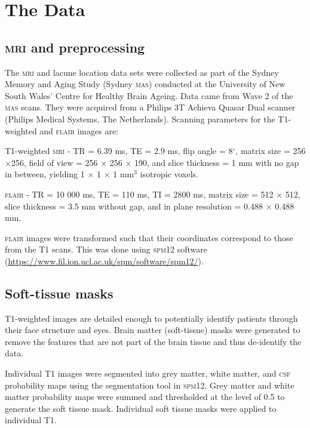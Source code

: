 %
%

\chapter{The Data}\label{model}

\section{\textsc{mri} and preprocessing}\label{data-mri}

The \textsc{mri} and lacune location data sets were collected as part of the Sydney Memory and Aging Study (Sydney \textsc{mas}) conducted at the University of New South Wales' Centre for Healthy Brain Ageing. Data came from Wave 2 of the \textsc{mas} scans. They were acquired from a Philips 3T Achieva Quasar Dual scanner (Philips Medical Systems, The Netherlands). Scanning parameters for the T1-weighted and \textsc{flair} images are:

T1-weighted \textsc{mri} - TR = 6.39 ms, TE = 2.9 ms, flip angle = 8$^\circ$, matrix size = 256$\times$256, field of view = 256 $\times$ 256 $\times$ 190, and slice thickness = 1 mm with no gap in between, yielding 1 $\times$ 1 $\times$ 1 mm$^3$ isotropic voxels.

\textsc{flair} - TR = 10 000 ms, TE = 110 ms, TI = 2800 ms, matrix size = 512 $\times$ 512, slice thickness = 3.5 mm without gap, and in plane resolution = 0.488 $\times$ 0.488 mm.

\textsc{flair} images were transformed such that their coordinates correspond to those from the T1 scans. This was done using \textsc{spm12} software (\url{https://www.fil.ion.ucl.ac.uk/spm/software/spm12/}).

\section{Soft-tissue masks}\label{data-soft}

T1-weighted images are detailed enough to potentially identify patients through their face structure and eyes. Brain matter (soft-tissue) masks were generated to remove the features that are not part of the brain tissue and thus de-identify the data.

Individual T1 images were segmented into grey matter, white matter, and \textsc{csf} probability maps using the segmentation tool in \textsc{spm12}. Grey matter and white matter probability maps were summed and thresholded at the level of 0.5 to generate the soft tissue mask. Individual soft tissue masks were applied to individual T1.

